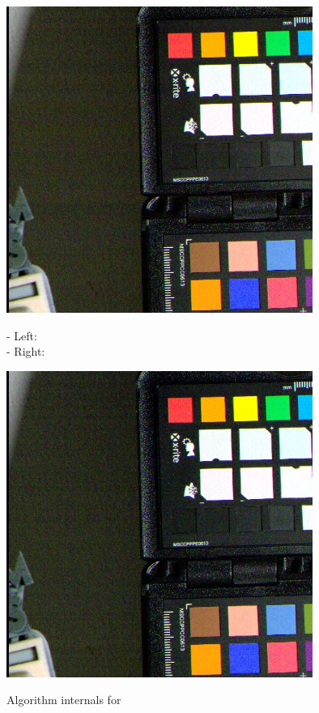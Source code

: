 \begin{center}
\includegraphics[height=10cm]{images/10ms+4-fixrn-crop}
\end{center}

- Left:  \\
- Right:  \\



\begin{center}
\includegraphics[height=10cm]{images/10ms+4-rnfilter2-crop}
\end{center}

Algorithm internals for 

